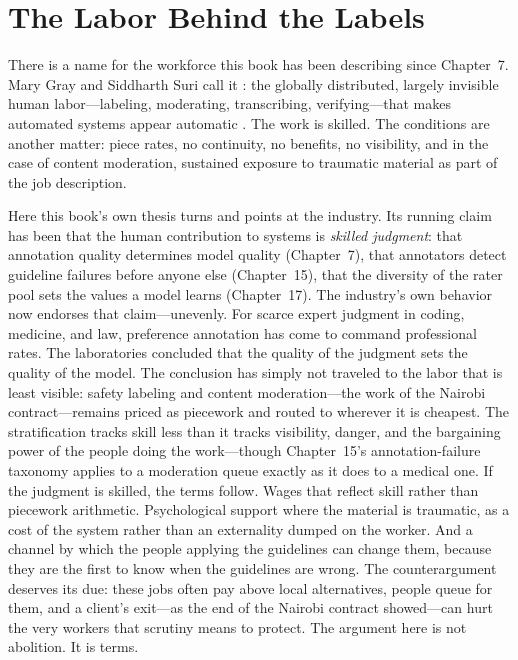 \section{The Labor Behind the Labels}
\label{sec:ch18-labor}

There is a name for the workforce this book has been describing since Chapter~7. Mary Gray and Siddharth Suri call it : the globally distributed, largely invisible human labor---labeling, moderating, transcribing, verifying---that makes automated systems appear automatic \autocite{gray2019ghost}. The work is skilled. The conditions are another matter: piece rates, no continuity, no benefits, no visibility, and in the case of content moderation, sustained exposure to traumatic material as part of the job description.

Here this book's own thesis turns and points at the industry. Its running claim has been that the human contribution to \hitl systems is \emph{skilled judgment}: that annotation quality determines model quality (Chapter~7), that annotators detect guideline failures before anyone else (Chapter~15), that the diversity of the rater pool sets the values a model learns (Chapter~17). The industry's own behavior now endorses that claim---unevenly. For scarce expert judgment in coding, medicine, and law, preference annotation has come to command professional rates. The laboratories concluded that the quality of the judgment sets the quality of the model. The conclusion has simply not traveled to the labor that is least visible: safety labeling and content moderation---the work of the Nairobi contract---remains priced as piecework and routed to wherever it is cheapest. The stratification tracks skill less than it tracks visibility, danger, and the bargaining power of the people doing the work---though Chapter~15's annotation-failure taxonomy applies to a moderation queue exactly as it does to a medical one. If the judgment is skilled, the terms follow. Wages that reflect skill rather than piecework arithmetic. Psychological support where the material is traumatic, as a cost of the system rather than an externality dumped on the worker. And a channel by which the people applying the guidelines can change them, because they are the first to know when the guidelines are wrong. The counterargument deserves its due: these jobs often pay above local alternatives, people queue for them, and a client's exit---as the end of the Nairobi contract showed---can hurt the very workers that scrutiny means to protect. The argument here is not abolition. It is terms.

